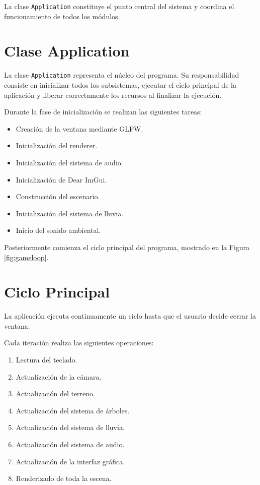 La clase \texttt{Application} constituye el punto central del sistema y coordina el funcionamiento de todos los módulos.


\section{Clase Application}

La clase \texttt{Application} representa el núcleo del programa. Su responsabilidad consiste en inicializar todos los subsistemas, ejecutar el ciclo principal de la aplicación y liberar correctamente los recursos al finalizar la ejecución.

Durante la fase de inicialización se realizan las siguientes tareas:

\begin{itemize}
\item Creación de la ventana mediante GLFW.
\item Inicialización del renderer.
\item Inicialización del sistema de audio.
\item Inicialización de Dear ImGui.
\item Construcción del escenario.
\item Inicialización del sistema de lluvia.
\item Inicio del sonido ambiental.
\end{itemize}

Posteriormente comienza el ciclo principal del programa, mostrado en la Figura \ref{fig:gameloop}.


\section{Ciclo Principal}

La aplicación ejecuta continuamente un ciclo hasta que el usuario decide cerrar la ventana.

Cada iteración realiza las siguientes operaciones:

\begin{enumerate}

\item Lectura del teclado.

\item Actualización de la cámara.

\item Actualización del terreno.

\item Actualización del sistema de árboles.

\item Actualización del sistema de lluvia.

\item Actualización del sistema de audio.

\item Actualización de la interfaz gráfica.

\item Renderizado de toda la escena.

\end{enumerate}

